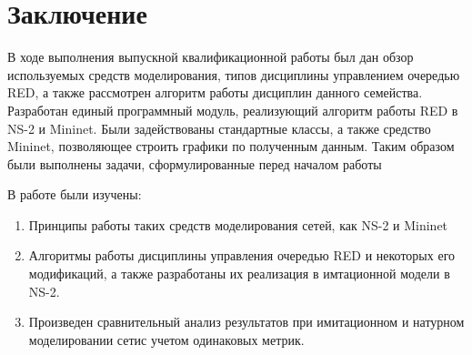 \chapter*{Заключение}

В ходе выполнения выпускной квалификационной работы был дан обзор используемых средств моделирования, типов дисциплины управлением очередью RED, а также рассмотрен алгоритм работы дисциплин данного семейства.
Разработан единый программный модуль, реализующий алгоритм работы RED в NS-2 и Mininet. Были задействованы стандартные классы, а также
средство Mininet, позволяющее строить графики по полученным данным.
Таким образом были выполнены задачи, сформулированные перед началом работы

В работе были изучены:

\begin{enumerate}
\item Принципы работы таких средств моделирования сетей, как NS-2 и Mininet 
\item Алгоритмы работы дисциплины управления очередью RED и некоторых его модификаций, а также
  разработаны их реализация в имтационной модели в NS-2.
\item Произведен сравнительный анализ результатов при имитационном и натурном моделировании сетис учетом одинаковых метрик. 
\end{enumerate}



\clearpage



